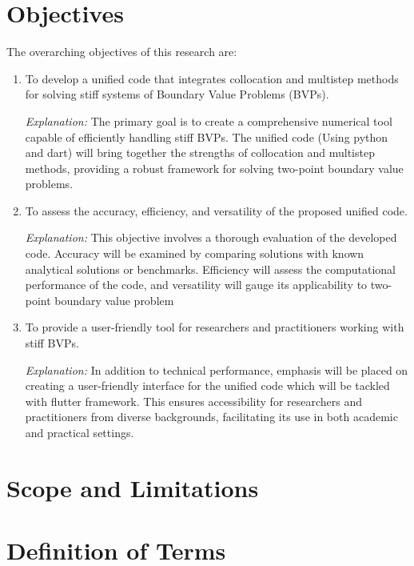 \section{Objectives}
\label{sec:objectives}

The overarching objectives of this research are:

\begin{enumerate}
    \item To develop a unified code that integrates collocation and multistep methods for solving stiff systems of Boundary Value Problems (BVPs).

    \textit{Explanation:} The primary goal is to create a comprehensive numerical tool capable of efficiently handling stiff BVPs. The unified code (Using python and dart) will bring together the strengths of collocation and multistep methods, providing a robust framework for solving two-point boundary value problems.

    \item To assess the accuracy, efficiency, and versatility of the proposed unified code.

    \textit{Explanation:} This objective involves a thorough evaluation of the developed code. Accuracy will be examined by comparing solutions with known analytical solutions or benchmarks. Efficiency will assess the computational performance of the code, and versatility will gauge its applicability to two-point boundary value problem

    \item To provide a user-friendly tool for researchers and practitioners working with stiff BVPs.

    \textit{Explanation:} In addition to technical performance, emphasis will be placed on creating a user-friendly interface for the unified code which will be tackled with flutter framework. This ensures accessibility for researchers and practitioners from diverse backgrounds, facilitating its use in both academic and practical settings.
\end{enumerate}




\section{Scope and Limitations}
\label{sec:scope-limitations}



\section{Definition of Terms}
\label{sec:definitions of terms}

